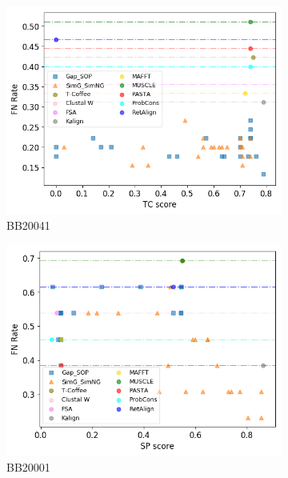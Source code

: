 \begin{figure}[!htbp]
\begin{adjustwidth}{-1cm}{-1cm}
\begin{subfigure}{0.22\textwidth}
			\includegraphics[width=\columnwidth]{Figure/summary/precomputedInit/Balibase/BB20041_fnrate_vs_tc_2}
			\caption{BB20041}
		\end{subfigure}
		\begin{subfigure}{0.22\textwidth}
			\includegraphics[width=\columnwidth]{Figure/summary/precomputedInit/Balibase/BB20001_fnrate_vs_sp_2}
			\caption{BB20001}
		\end{subfigure}	
		\begin{subfigure}{0.22\textwidth}

\end{subfigure}
\end{adjustwidth}
\end{figure}
